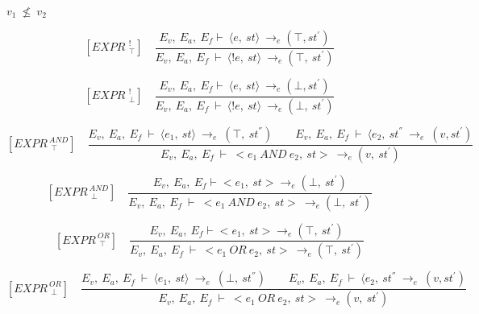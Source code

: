 	
	\begin{math}		
		v_1 \ \nleq \ v_2		
	\end{math}
	
	
	
	
	
	\[	
	[EXPR^{\ \ !}_{\ \ \top}] \quad	
	\dfrac{E_v, \ E_a, \ E_f \vdash \ \langle e, \ st \rangle \ \rightarrow_e (\top, st^{'})}{E_v, \ E_a, \ E_f \ \vdash \ \langle !e, \ st \rangle \ \rightarrow_e (\top, \ st^{'})}	
	\] 
	
	
	
	
	
	\[	
	[EXPR^{\ \ !}_{\ \ \bot}] \quad	
	\dfrac{E_v, \ E_a, \ E_f \vdash \ \langle e, \ st \rangle \ \rightarrow_e (\bot, st^{'})}{E_v, \ E_a, \ E_f \ \vdash \ \langle !e, \ st \rangle \ \rightarrow_e (\bot, \ st^{'})}	
	\]
	
	
	
	
	
	
	
	
	\[	
	[EXPR^{\ AND}_{\ \ \top}] \quad	
	\dfrac{E_v, \ E_a, \ E_f \ \vdash \ \langle e_1, \ st \rangle \ \rightarrow_e \ (\top, \ st^{''}) \qquad E_v, \ E_a, \ E_f \ \vdash \ \langle e_2, \ st^{''} \ \rightarrow_e \ (v, st^{'})}{E_v, \ E_a, \ E_f \ \vdash \ <e_1 \ AND \ e_2, \ st> \ \rightarrow_e (v, \ st^{'})}	
	\] 
	
	
	
	
	
	\[	
	[EXPR^{\ AND}_{\ \ \bot}] \quad	
	\dfrac{E_v, \ E_a, \ E_f \vdash <e_1, \ st> \rightarrow_e (\bot, \ st^{'}) }{E_v, \ E_a, \ E_f \ \vdash \ <e_1 \ AND \ e_2, \ st> \ \rightarrow_e (\bot, \ st^{'})}	
	\]
	
	
	
	
	
	
	
	
	\[	
	[EXPR^{\ OR}_{\ \ \top}] \quad	
	\dfrac{E_v, \ E_a, \ E_f \vdash <e_1, \ st> \rightarrow_e (\top, \ st^{'}) }{E_v, \ E_a, \ E_f \ \vdash \ <e_1 \ OR \ e_2, \ st> \ \rightarrow_e (\top, \ st^{'})}	
	\]
	
	
	
	
	
	\[	
	[EXPR^{\ OR}_{\ \ \bot}] \quad	
	\dfrac{E_v, \ E_a, \ E_f \ \vdash \ \langle e_1, \ st \rangle \ \rightarrow_e \ (\bot, \ st^{''}) \qquad E_v, \ E_a, \ E_f \ \vdash \ \langle e_2, \ st^{''} \ \rightarrow_e \ (v, st^{'})}{E_v, \ E_a, \ E_f \ \vdash \ <e_1 \ OR \ e_2, \ st> \ \rightarrow_e (v, \ st^{'})}
	\]
	
	
	
	
	
	
	
	
	
	
	
	
	
